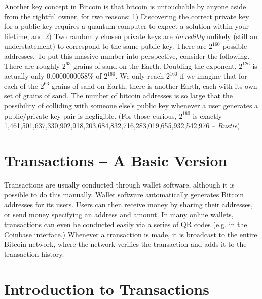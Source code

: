 \documentclass[full.tex]{subfiles}
\begin{document}
    Another key concept in Bitcoin is that bitcoin is untouchable by anyone aside from the rightful owner, for two reasons: 1) Discovering the correct private key for a public key requires a quantum computer to expect a solution within your lifetime, and 2) Two randomly chosen private keys are \textit{incredibly} unlikely (still an understatement) to correspond to the same public key. There are $2^{160}$ possible addresses. To put this massive number into perspective, consider the following. There are roughly $2^{63}$ grains of sand on the Earth. Doubling the exponent, $2^{126}$ is actually only 0.0000000058\% of $2^{160}$. We only reach $2^{160}$ if we imagine that for each of the $2^{63}$ grains of sand on Earth, there is another Earth, each with its own set of grains of sand. The number of bitcoin addresses is so large that the possibility of colliding with someone else's public key whenever a user generates a public/private key pair is negligible. (For those curious, $2^{160}$ is exactly 1,461,501,637,330,902,918,203,684,832,716,283,019,655,932,542,976 -- \textit{Rustie}) 
    
    \section*{Transactions -- A Basic Version}
    
    Transactions are usually conducted through wallet software, although it is possible to do this manually. Wallet software automatically generates Bitcoin addresses for its users. Users can then receive money by sharing their addresses, or send money specifying an address and amount. In many online wallets, transactions can even be conducted easily via a series of QR codes (e.g. in the Coinbase interface.) Whenever a transaction is made, it is broadcast to the entire Bitcoin network, where the network verifies the transaction and adds it to the transaction history.
    
    \section*{Introduction to Transactions}
    
\end{document}
